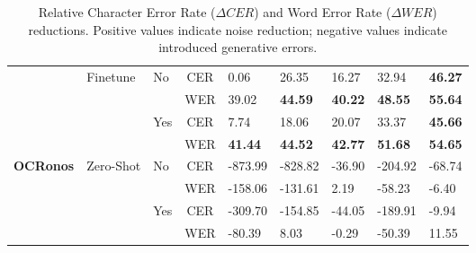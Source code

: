 \documentclass[11pt]{extarticle}
\newcommand{\cR}[1]{\cellcolor{badred}#1}
\newcommand{\cG}[1]{\cellcolor{goodgreen}#1}
\newcommand{\cB}[1]{\cellcolor{bestgreen}\textbf{#1}} %
\begin{document}
\begin{table}[htbp]
{\begin{tabular}{lllc *{5}{>{\centering\arraybackslash}p{1.8cm}}}
    & \multirow{4}{*}{Finetune} & \multirow{2}{*}{No} & CER & \cG{0.06} & \cG{26.35} & \cG{16.27} & \cG{32.94} & \cB{46.27} \\
    & & & WER & \cG{39.02} & \cB{44.59} & \cB{40.22} & \cB{48.55} & \cB{55.64} \\
    \cmidrule{3-9}
    & & \multirow{2}{*}{Yes} & CER & \cG{7.74} & \cG{18.06} & \cG{20.07} & \cG{33.37} & \cB{45.66} \\
    & & & WER & \cB{41.44} & \cB{44.52} & \cB{42.77} & \cB{51.68} & \cB{54.65} \\
    \midrule
    \multirow{4}{*}{\textbf{OCRonos}} & \multirow{4}{*}{Zero-Shot} & \multirow{2}{*}{No} & CER & \cR{-873.99} & \cR{-828.82} & \cR{-36.90} & \cR{-204.92} & \cR{-68.74} \\
    & & & WER & \cR{-158.06} & \cR{-131.61} & \cG{2.19} & \cR{-58.23} & \cR{-6.40} \\
    \cmidrule{3-9}
    & & \multirow{2}{*}{Yes} & CER & \cR{-309.70} & \cR{-154.85} & \cR{-44.05} & \cR{-189.91} & \cR{-9.94} \\
    & & & WER & \cR{-80.39} & \cG{8.03} & \cR{-0.29} & \cR{-50.39} & \cG{11.55} \\
    \bottomrule
    \end{tabular}%
    }
    \caption{Relative Character Error Rate ($\Delta CER$) and Word Error Rate ($\Delta WER$) reductions. Positive values indicate noise reduction; negative values indicate introduced generative errors.}
    \label{tab:quantitative_results}
\end{table}
\end{document}
